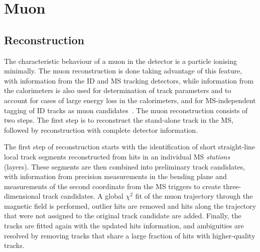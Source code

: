 \section{Muon}
\subsection{Reconstruction}
The characteristic behaviour of a muon in the detector is a particle
ionising minimally. 
The muon reconstruction is done taking advantage of this feature, 
with information from the ID and MS tracking detectors, while
information from the calorimeters is also used
for determination of track parameters and to account for cases of
large energy loss in the calorimeters, and for MS-independent
tagging of ID tracks as muon candidates~\cite{CERN-EP-2020-199}.
The muon reconstruction consists of two steps. 
The first step is to reconstruct the stand-alone track in the MS,
followed by reconstruction with complete detector information.

The first step of reconstruction starts with the identification 
of short straight-line local track segments reconstructed 
from hits in an individual MS \textit{stations} (layers). 
These segments are then combined into preliminary track candidates, 
with information from precision measurements in the bending plane 
and measurements of the second coordinate from 
the MS triggers to create three-dimensional track candidates. 
A global $\chi^2$ fit of the muon trajectory 
through the magnetic field is performed,
outlier hits are removed and hits along the trajectory that
were not assigned to the original track candidate are added.
Finally, the tracks are fitted again with the updated hits information,
and ambiguities are resolved by removing tracks
that share a large fraction of hits with higher-quality tracks.

